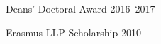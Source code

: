 
Deans' Doctoral Award                           \hfill 2016--2017

Erasmus-LLP Scholarship                         \hfill 2010
